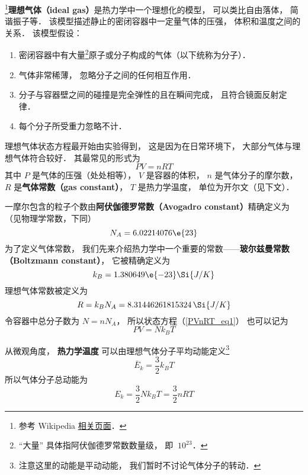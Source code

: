 

\footnote{参考 Wikipedia \href{https://en.wikipedia.org/wiki/Ideal_gas}{相关页面}．}\textbf{理想气体（ideal gas）}是热力学中一个理想化的模型， 可以类比自由落体， 简谐振子等． 该模型描述静止的密闭容器中一定量气体的压强， 体积和温度之间的关系． 该模型假设：
\begin{enumerate}
\item 密闭容器中有大量\footnote{“大量” 具体指阿伏伽德罗常数数量级， 即 $~10^{23}$．}原子或分子构成的气体（以下统称为分子）．
\item 气体非常稀薄， 忽略分子之间的任何相互作用．
\item 分子与容器壁之间的碰撞是完全弹性的且在瞬间完成， 且符合镜面反射定律．
\item 每个分子所受重力忽略不计．
\end{enumerate}

理想气体状态方程最开始由实验得到， 这是因为在日常环境下， 大部分气体与理想气体符合较好． 其最常见的形式为
\begin{equation}\label{PVnRT_eq1}
PV = nRT
\end{equation}
其中 $P$ 是气体的压强（处处相等）， $V$ 是容器的体积， $n$ 是气体分子的摩尔数， $R$ 是\textbf{气体常数（gas constant）}， $T$ 是热力学温度， 单位为开尔文（见下文）．

一摩尔包含的粒子个数由\textbf{阿伏伽德罗常数（Avogadro constant）}精确定义为（见物理学常数，下同）
\begin{equation}
N_A = 6.02214076\e{23}
\end{equation}
为了定义气体常数， 我们先来介绍热力学中一个重要的常数——\textbf{玻尔兹曼常数（Boltzmann constant）}， 它被精确定义为
\begin{equation}
k_B = 1.380649\e{-23} \Si{J/K}
\end{equation}
理想气体常数被定义为
\begin{equation}\label{PVnRT_eq2}
R = k_B N_A = 8.31446261815324 \,\Si{J/K}
\end{equation}
令容器中总分子数为 $N = n N_A$， 所以状态方程（\autoref{PVnRT_eq1}） 也可以记为
\begin{equation}\label{PVnRT_eq4}
PV = N k_B T
\end{equation}

从微观角度， \textbf{热力学温度} 可以由理想气体分子平均动能定义\footnote{注意这里的动能是平动动能， 我们暂时不讨论气体分子的转动．}
\begin{equation}\label{PVnRT_eq3}
\bar E_k = \frac32 k_B T
\end{equation}
所以气体分子总动能为
\begin{equation}\label{PVnRT_eq5}
E_k = \frac32 Nk_B T = \frac{3}{2}nRT
\end{equation}


